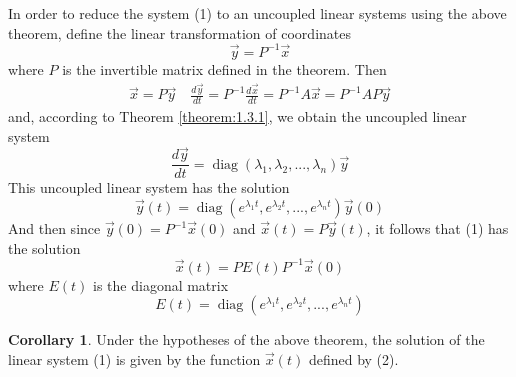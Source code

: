 \documentclass[11pt]{book}
\theoremstyle{definition}\newtheorem{definition}[subsection]{Definition}
\theoremstyle{definition}\newtheorem{example}[subsection]{Example}
\theoremstyle{definition}\newtheorem{notation}[subsection]{Notation}
\theoremstyle{definition}\newtheorem{remark}[subsection]{Remark}
\theoremstyle{theorem}\newtheorem{theorem}[subsection]{Theorem}
\theoremstyle{theorem}\newtheorem{lemma}[subsection]{Lemma}
\theoremstyle{theorem}\newtheorem{proposition}[subsection]{Proposition}
\theoremstyle{theorem}\newtheorem{corollary}[subsection]{Corollary}
\theoremstyle{theorem}\newtheorem{case}{Case}
\theoremstyle{remark}\newtheorem{subcase}{Subcase}[case]
\DeclareMathOperator{\diag}{diag}
\begin{document}
In order to reduce the system (1) to an uncoupled linear systems using the above theorem, define the linear transformation of coordinates
\begin{equation*}
    \vec{y} = P^{-1}\vec{x}
\end{equation*}
where $P$ is the invertible matrix defined in the theorem. Then
\begin{align*}
    \vec{x} = P\vec{y} \quad \frac{d\vec{y}}{dt} = P^{-1}\frac{d\vec{x}}{dt} = P^{-1}A\vec{x} = P^{-1}AP\vec{y}
\end{align*}
and, according to Theorem \ref{theorem:1.3.1}, we obtain the uncoupled linear system
\begin{equation*}
    \frac{d\vec{y}}{dt} = \diag(\lambda_1, \lambda_2,..., \lambda_n)\vec{y}
\end{equation*}
This uncoupled linear system has the solution
\begin{equation*}
    \vec{y}(t) = \diag(e^{\lambda_1t}, e^{\lambda_2t},..., e^{\lambda_nt})\vec{y}(0)
\end{equation*}
And then since $\vec{y}(0) = P^{-1}\vec{x}(0)$ and $\vec{x}(t) = P\vec{y}(t)$, it follows that (1) has the solution
\begin{equation*}
    \vec{x}(t) = PE(t)P^{-1}\vec{x}(0) \tag{2}
\end{equation*}
where $E(t)$ is the diagonal matrix
\begin{equation*}
    E(t) = \diag(e^{\lambda_1t}, e^{\lambda_2t},..., e^{\lambda_nt})
\end{equation*}

\begin{corollary}\label{corollary:1.3.2}
    Under the hypotheses of the above theorem, the solution of the linear system (1) is given by the function $\vec{x}(t)$ defined by (2).
\end{corollary}
\end{document}
